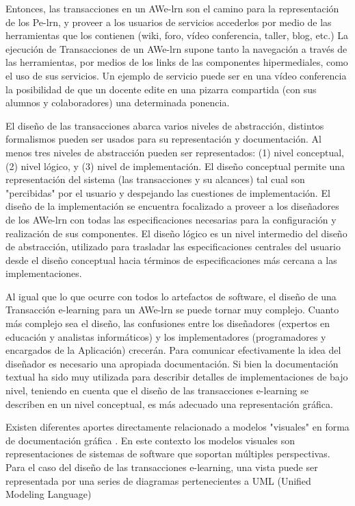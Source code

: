 Entonces, las transacciones en un AWe-lrn son el camino para la representación
de los Pe-lrn, y proveer a los usuarios de servicios accederlos por medio de las
herramientas que los contienen (wiki, foro, vídeo conferencia, taller, blog,
etc.) La ejecución de Transacciones de un AWe-lrn supone tanto la navegación a
través de las herramientas, por medios de los links de las componentes
hipermediales, como  el uso de sus servicios. Un ejemplo de servicio puede ser
en una vídeo conferencia la posibilidad de que un docente edite en una pizarra
compartida (con sus alumnos y colaboradores) una determinada ponencia. 

El diseño de las transacciones abarca varios niveles de abstracción, distintos
formalismos pueden ser usados para su representación y documentación. Al menos
tres niveles de abstracción pueden ser representados: (1) nivel conceptual, (2)
nivel lógico, y (3) nivel de implementación.  El diseño conceptual permite una
representación del sistema (las transacciones y su alcances) tal cual son
"percibidas" por el usuario y despejando las cuestiones de implementación. El
diseño de la implementación se encuentra focalizado a proveer a los diseñadores
de los AWe-lrn con todas las especificaciones necesarias para la configuración y
realización de sus componentes. El diseño lógico es un nivel intermedio del
diseño de abstracción, utilizado para  trasladar las especificaciones centrales
del usuario desde el diseño conceptual hacia términos de  especificaciones más
cercana a las implementaciones.


Al igual que lo que ocurre con todos lo artefactos de software, el diseño de una
Transacción e-learning para un AWe-lrn  se puede tornar muy complejo. Cuanto más
complejo sea el diseño, las confusiones entre los diseñadores (expertos en
educación y analistas informáticos) y los implementadores (programadores y 
encargados de la Aplicación) crecerán. Para comunicar efectivamente la idea del
diseñador es necesario una apropiada documentación. Si bien la documentación
textual ha sido muy utilizada para describir detalles de implementaciones de
bajo nivel, teniendo en cuenta que el diseño de las transacciones e-learning se
describen en un  nivel conceptual, es más adecuado una representación gráfica. 

Existen diferentes aportes  directamente relacionado a modelos "visuales" en
forma de documentación gráfica \cite{5,10,12}. En este contexto los modelos
visuales son representaciones de sistemas de software que soportan múltiples
perspectivas. Para el caso del diseño de las transacciones e-learning, una vista
puede ser representada por una series de diagramas pertenecientes a UML (Unified
Modeling Language) \cite{UML} 

